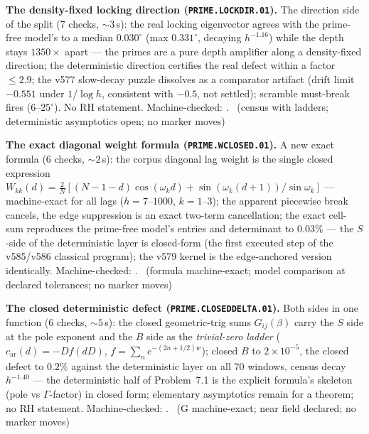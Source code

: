 \documentclass[11pt,a4paper]{article}
\theoremstyle{definition}
\begin{document}
\par\smallskip\noindent\textbf{The density-fixed locking direction
(\texttt{PRIME.LOCKDIR.01}).}
The direction side of the split ($7$ checks, ${\sim}3$\,s): the real
locking eigenvector agrees with the prime-free model's to a median
$0.030^\circ$ (max $0.331^\circ$, decaying $h^{-1.16}$) while the
depth stays $1350\times$ apart --- the primes are a pure depth
amplifier along a density-fixed direction; the deterministic direction
certifies the real defect within a factor $\le2.9$; the v577
slow-decay puzzle dissolves as a comparator artifact (drift limit
$-0.551$ under $1/\log h$, consistent with $-0.5$, not settled);
scramble must-break fires ($6$--$25^\circ$).  No RH statement.
Machine-checked: .
\mE\ (census with ladders; deterministic asymptotics open; no marker
moves)
\par\smallskip

\par\smallskip\noindent\textbf{The exact diagonal weight formula
(\texttt{PRIME.WCLOSED.01}).}
A new exact formula ($6$ checks, ${\sim}2$\,s): the corpus diagonal lag
weight is the single closed expression
$W_{kk}(d)=\tfrac{2}{N}[(N{-}1{-}d)\cos(\omega_k d)
+\sin(\omega_k(d{+}1))/\sin\omega_k]$ --- machine-exact for all lags
($h=7$--$1000$, $k=1$--$3$); the apparent piecewise break cancels, the
edge suppression is an exact two-term cancellation; the exact cell-sum
reproduces the prime-free model's entries and determinant to $0.03\%$
--- the $S$-side of the deterministic layer is closed-form (the first
executed step of the v585/v586 classical program); the v579 kernel is
the edge-anchored version identically. Machine-checked:
.
\mE\ (formula machine-exact; model comparison at declared tolerances;
no marker moves)
\par\smallskip

\par\smallskip\noindent\textbf{The closed deterministic defect
(\texttt{PRIME.CLOSEDDELTA.01}).}
Both sides in one function ($6$ checks, ${\sim}5$\,s): the closed
geometric-trig sums $G_{ij}(\beta)$ carry the $S$ side at the pole
exponent and the $B$ side as the \emph{trivial-zero ladder}
($c_{\mathrm{ar}}(d)=-Df(dD)$, $f=\sum_n e^{-(2n+1/2)w}$); closed $B$
to $2\times10^{-5}$, the closed defect to $0.2\%$ against the
deterministic layer on all $70$ windows, census decay $h^{-1.40}$ ---
the deterministic half of Problem~7.1 is the explicit formula's
skeleton (pole vs $\Gamma$-factor) in closed form; elementary
asymptotics remain for a theorem; no RH statement. Machine-checked:
.
\mE\ (G machine-exact; near field declared; no marker moves)
\par\smallskip
\end{document}

